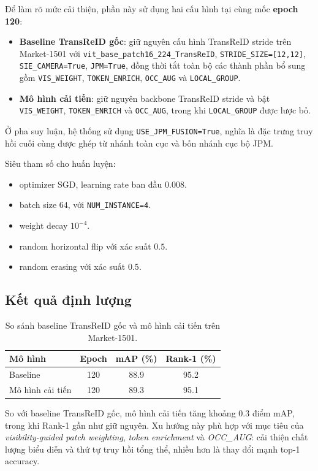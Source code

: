 Để làm rõ mức cải thiện, phần này sử dụng hai cấu hình tại cùng mốc
\textbf{epoch 120}:
\begin{itemize}
    \item \textbf{Baseline TransReID gốc}: giữ nguyên cấu hình TransReID stride
    trên Market-1501 với \texttt{vit\_base\_patch16\_224\_TransReID},
    \texttt{STRIDE\_SIZE=[12,12]}, \texttt{SIE\_CAMERA=True},
    \texttt{JPM=True}, đồng thời tắt toàn bộ các thành phần bổ sung gồm
    \texttt{VIS\_WEIGHT}, \texttt{TOKEN\_ENRICH}, \texttt{OCC\_AUG} và
    \texttt{LOCAL\_GROUP}.
    \item \textbf{Mô hình cải tiến}: giữ nguyên backbone TransReID stride và bật
    \texttt{VIS\_WEIGHT}, \texttt{TOKEN\_ENRICH} và \texttt{OCC\_AUG}, trong khi
    \texttt{LOCAL\_GROUP} được lược bỏ.
\end{itemize}

Ở pha suy luận, hệ thống sử dụng \texttt{USE\_JPM\_FUSION=True}, nghĩa là đặc
trưng truy hồi cuối cùng được ghép từ nhánh toàn cục và bốn nhánh cục bộ JPM.

Siêu tham số cho huấn luyện:
\begin{itemize}
    \item optimizer SGD, learning rate ban đầu $0.008$.
    \item batch size $64$, với \texttt{NUM\_INSTANCE=4}.
    \item weight decay $10^{-4}$.
    \item random horizontal flip với xác suất $0.5$.
    \item random erasing với xác suất $0.5$.
\end{itemize}

\subsection{Kết quả định lượng}

\begin{table}[t]
\centering
\caption{So sánh baseline TransReID gốc và mô hình cải tiến trên Market-1501.}
\label{tab:baseline-vs-improved-epoch120}
\begin{tabular}{l|c|c|c}
\hline
Mô hình & Epoch & mAP (\%) & Rank-1 (\%) \\
\hline
Baseline & 120 & 88.9 & 95.2 \\
Mô hình cải tiến & 120 & 89.3 & 95.1 \\
\hline
\end{tabular}
\end{table}

So với baseline TransReID gốc, mô hình cải tiến tăng khoảng $0.3$ điểm mAP,
trong khi Rank-1 gần như giữ nguyên. Xu hướng này phù hợp với mục tiêu của
\textit{visibility-guided patch weighting}, \textit{token enrichment} và
\textit{OCC\_AUG}: cải thiện chất lượng biểu diễn và thứ tự truy hồi tổng thể,
nhiều hơn là thay đổi mạnh top-1 accuracy.
